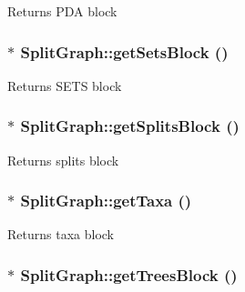 \label{classSplitGraph_a6eb74cff199a65a2e3b3a17c7a7c96e9}
\begin{DoxyReturn}{Returns}
PDA block 
\end{DoxyReturn}
\hypertarget{classSplitGraph_acafe07757402de0ed22320bcc2429f55}{
\subsubsection[{getSetsBlock}]{$\ast$ SplitGraph::getSetsBlock ()}}
\label{classSplitGraph_acafe07757402de0ed22320bcc2429f55}
\begin{DoxyReturn}{Returns}
SETS block 
\end{DoxyReturn}
\hypertarget{classSplitGraph_a4a4029deff1beb7089b3559790da4b2d}{
\subsubsection[{getSplitsBlock}]{$\ast$ SplitGraph::getSplitsBlock ()}}
\label{classSplitGraph_a4a4029deff1beb7089b3559790da4b2d}
\begin{DoxyReturn}{Returns}
splits block 
\end{DoxyReturn}
\hypertarget{classSplitGraph_a3f0181782d3b80190ea24a8eeb44b289}{
\subsubsection[{getTaxa}]{$\ast$ SplitGraph::getTaxa ()}}
\label{classSplitGraph_a3f0181782d3b80190ea24a8eeb44b289}
\begin{DoxyReturn}{Returns}
taxa block 
\end{DoxyReturn}
\hypertarget{classSplitGraph_ad10d2632515ccf7b795cb9ace660e050}{
\subsubsection[{getTreesBlock}]{$\ast$ SplitGraph::getTreesBlock ()}}
